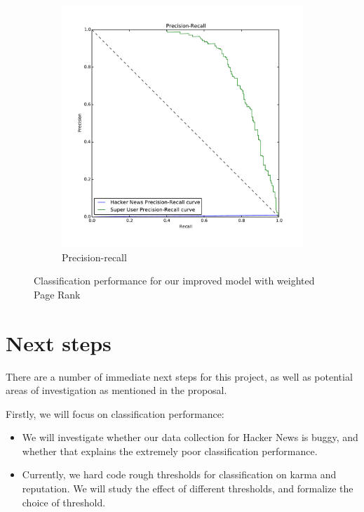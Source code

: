 \documentclass[10pt]{article}
\begin{document}
\begin{figure}[h]
\begin{subfigure}{0.5\textwidth}
\includegraphics[width=\linewidth]{classification_pr_curve}
\caption{Precision-recall}
\label{fig:pr-curve}
\end{subfigure}
\caption{Classification performance for our improved model with weighted Page
Rank}
\label{fig:classification}
\end{figure}

\section{Next steps}
\label{sec:next-steps}

There are a number of immediate next steps for this project, as well as
potential areas of investigation as mentioned in the proposal.

Firstly, we will focus on classification performance:
\begin{itemize}
  \item We will investigate whether our data collection for Hacker News is buggy,
    and whether that explains the extremely poor classification performance.
  \item Currently, we hard code rough thresholds for classification on karma and
    reputation. We will study the effect of different thresholds, and formalize
    the choice of threshold.
\end{itemize}
\end{document}
